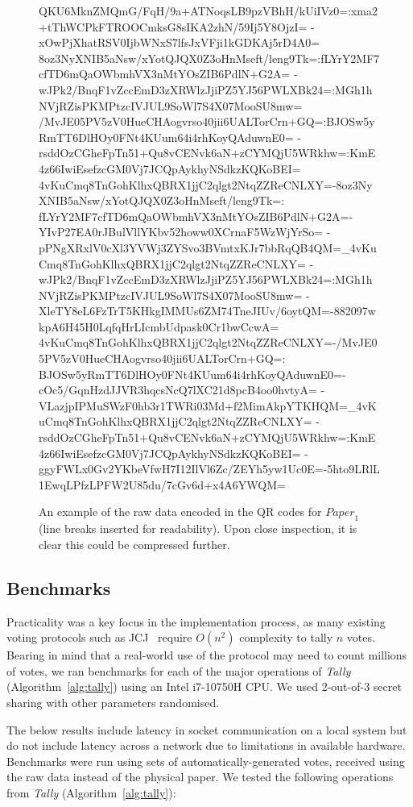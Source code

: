 \documentclass[12pt,a4paper]{article}
\theoremstyle{definition}
\newcommand{\Paper}{\mathit{Paper}}
\begin{document}
\begin{figure}
    \begin{verbnobox}[\tiny]
QKU6MknZMQmG/FqH/9a+ATNoqsLB9pzVBhH/kUiIVz0=:xma2+tThWCPkFTROOCmksG8sIKA2zhN/59Ij5Y8OjzI=
-xOwPjXhatRSV0IjbWNxS7lfsJxVFji1kGDKAj5rD4A0=
8oz3NyXNIB5aNsw/xYotQJQX0Z3oHnMseft/leng9Tk=:fLYrY2MF7cfTD6mQaOWbmhVX3nMtYOsZIB6PdlN+G2A=
-wJPk2/BnqF1vZccEmD3zXRWlzJjiPZ5YJ56PWLXBk24=:MGh1hNVjRZisPKMPtzcIVJUL9SoWl7S4X07MooSU8mw=
/MvJE05PV5zV0HueCHAogvrso40jii6UALTorCrn+GQ=:BJOSw5yRmTT6DlHOy0FNt4KUum64i4rhKoyQAduwnE0=
-rsddOzCGheFpTn51+Qu8vCENvk6aN+zCYMQjU5WRkhw=:KmE4z66IwiEsefzcGM0Vj7JCQpAykhyNSdkzKQKoBEI=
4vKuCmq8TnGohKlhxQBRX1jjC2qlgt2NtqZZReCNLXY=-8oz3NyXNIB5aNsw/xYotQJQX0Z3oHnMseft/leng9Tk=:
fLYrY2MF7cfTD6mQaOWbmhVX3nMtYOsZIB6PdlN+G2A=-YIvP27EA0rJBulVllYKbv52howw0XCrnaF5WzWjYrSo=
-pPNgXRxlV0cXl3YVWj3ZYSvo3BVmtxKJr7bbRqQB4QM=_4vKuCmq8TnGohKlhxQBRX1jjC2qlgt2NtqZZReCNLXY=
-wJPk2/BnqF1vZccEmD3zXRWlzJjiPZ5YJ56PWLXBk24=:MGh1hNVjRZisPKMPtzcIVJUL9SoWl7S4X07MooSU8mw=
-XleTY8eL6FzTrT5KHkgIMMUs6ZM74TneJIUv/6oytQM=-882097wkpA6H45H0LqfqHrLIcmbUdpask0Cr1bwCcwA=
4vKuCmq8TnGohKlhxQBRX1jjC2qlgt2NtqZZReCNLXY=-/MvJE05PV5zV0HueCHAogvrso40jii6UALTorCrn+GQ=:
BJOSw5yRmTT6DlHOy0FNt4KUum64i4rhKoyQAduwnE0=-cOc5/GqnHzdJJVR3hqcsNcQ7lXC21d8pcB4oo0hvtyA=
-VLazjpIPMuSWzF0hb3r1TWRi03Md+f2MimAkpYTKHQM=_4vKuCmq8TnGohKlhxQBRX1jjC2qlgt2NtqZZReCNLXY=
-rsddOzCGheFpTn51+Qu8vCENvk6aN+zCYMQjU5WRkhw=:KmE4z66IwiEsefzcGM0Vj7JCQpAykhyNSdkzKQKoBEI=
-ggyFWLx0Gv2YKbeVfwH7I12IlVl6Zc/ZEYh5yw1Uc0E=-5hto9LRlL1EwqLPfzLPFW2U85du/7cGv6d+x4A6YWQM=
    \end{verbnobox}
    \centering
    \caption{An example of the raw data encoded in the QR codes for $\Paper_1$ (line breaks inserted for readability). Upon close inspection, it is clear this could be compressed further.}
    \label{fig:prototype-paper-raw}
\end{figure}
\subsection{Benchmarks}
Practicality was a key focus in the implementation process, as many existing voting protocols such as JCJ~\cite{juels2010coercion} require $O(n^2)$ complexity to tally $n$ votes. Bearing in mind that a real-world use of the protocol may need to count millions of votes, we ran benchmarks for each of the major operations of \textit{Tally} (Algorithm~\ref{alg:tally}) using an Intel i7-10750H CPU. We used 2-out-of-3 secret sharing with other parameters randomised.

The below results include latency in socket communication on a local system but do not include latency across a network due to limitations in available hardware. Benchmarks were run using sets of automatically-generated votes, received using the raw data instead of the physical paper. We tested the following operations from \textit{Tally} (Algorithm~\ref{alg:tally}):
\end{document}
